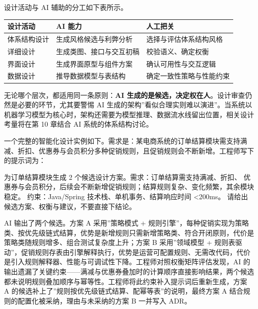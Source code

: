 \documentclass[
]{ctexbook}
\newenvironment{Shaded}{
  \ttfamily\small
}{}
\newcommand{\NormalTok}[1]{#1}
\newcounter{none}
\begin{document}
设计活动与 AI 辅助的分工如下表所示。

{\def\LTcaptype{none} %
\begin{longtable}[]{@{}lll@{}}
\toprule\noalign{}
设计活动 & AI 能力 & 人工把关 \\
\midrule\noalign{}
\endhead
\bottomrule\noalign{}
\endlastfoot
体系结构设计 & 生成风格候选与利弊分析 & 选择与评估体系结构风格 \\
详细设计 & 生成类图、接口与交互初稿 & 校验语义、确定权衡 \\
界面设计 & 生成界面原型与组件方案 & 确认可用性与交互逻辑 \\
数据设计 & 推导数据模型与表结构 & 确定一致性策略与性能约束 \\
\end{longtable}
}

无论哪个层次，都适用同一条原则：\textbf{AI
生成的是候选，决定权在人}。设计审查仍然是必要的环节，尤其要警惕 AI
生成的架构''看似合理实则难以演进''。当系统以机器学习模型为核心时，架构还需要为模型推理、数据流水线留出位置，相关设计考量将在第
10 章结合 AI 系统的体系结构讨论。

一个完整的智能化设计实例如下。需求是：某电商系统的订单结算模块需支持满减、折扣、优惠券与会员积分多种促销规则，且促销规则会不断新增。工程师写下的提示词为：

\begin{Shaded}
\begin{Highlighting}[]
\NormalTok{为订单结算模块生成 2 个候选设计方案。需求：订单结算需支持满减、折扣、}
\NormalTok{优惠券与会员积分，后续会不断新增促销规则；结算规则复杂、变化频繁，其余模块稳定。}
\NormalTok{约束：Java/Spring 技术栈、单机事务、结算响应时间 \textless{}200ms。}
\NormalTok{请给出候选方案、权衡与建议，不要直接下结论。}
\end{Highlighting}
\end{Shaded}

AI 输出了两个候选。方案 A 采用''策略模式 +
规则引擎''，每种促销实现为策略类、按优先级链式结算，优势是新增规则只需新增策略类、符合开闭原则，代价是策略类随规则增多、组合测试复杂度上升；方案
B 采用''领域模型 +
规则表驱动''，促销规则存表由引擎解释执行，优势是运营可配置规则、无需改代码，代价是引入规则解释器、性能与可调试性下降。工程师对照权衡矩阵评估发现，AI
的输出遗漏了关键约束------满减与优惠券叠加时的计算顺序直接影响结果，两个候选都未说明规则叠加顺序与幂等性。工程师将此约束补入提示词后重新生成，方案
A 的候选补上了''规则按优先级链式结算、配幂等表''的说明，最终方案 A
结合规则的配置化被采纳，理由与未采纳的方案 B 一并写入 ADR。
\end{document}
